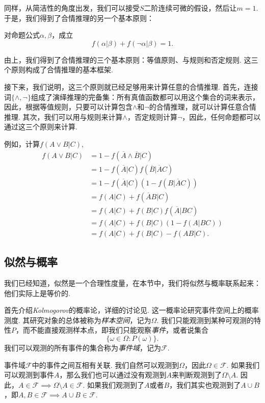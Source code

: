 同样，从简洁性的角度出发，我们可以接受$S$二阶连续可微的假设，然后让$m=1$. 于是，我们得到了合情推理的另一个基本原则：
\begin{principle}[否定规则]
对命题公式$\alpha,\beta$，成立
\[f(\alpha|\beta) + f(\neg\alpha|\beta) = 1.\]
\end{principle}

由上，我们得到了合情推理的三个基本原则：等值原则、与规则和否定规则. 这三个原则构成了合情推理的基本框架.

接下来，我们说明，这三个原则就已经足够用来计算任意的合情推理. 首先，连接词$\{\wedge,\neg\}$组成了演绎推理的完备集：所有真值函数都可以用这个集合的词来表示，因此，根据等值规则，只要可以计算包含$\wedge$和$\neg$的合情推理，就可以计算任意合情推理. 其次，我们可以用与规则来计算$\wedge$，否定规则计算$\neg$，因此，任何命题都可以通过这三个原则来计算.

\begin{example}
    例如，计算$f(A\vee B|C)$,
        \begin{align*}
            f(A \vee B|C) 
            &= 1 - f(\overline{A}\wedge\overline{B}|C)\\
            & = 1 - f(\overline{A}|C)f(\overline{B}|\overline{A}C) \\
            &= 1 - f(\overline{A}|C)(1 - f(B|\overline{A}C))\\
            &= f(A|C) + f(\overline{A}B|C) \\
            &= f(A|C) + f(B|C)f(\overline{A}|BC) \\
            &= f(A|C) + f(B|C)(1 - f(A|BC))\\
            &= f(A|C) + f(B|C) - f(AB|C).
        \end{align*}
\end{example}


\subsection{似然与概率}
我们已经知道，似然是一个合理性度量，在本节中，我们将似然与概率联系起来：他们实际上是等价的.

首先介绍\textit{Kolmogorov}的概率论，详细的讨论见. 这一概率论研究事件空间上的概率测度. 其研究对象的总体被称为\textit{样本空间}，记为$\Omega$. 我们只能观测到某种可观测的特性$P$，而不能直接观测样本点，即我们只能观察\textit{事件}，或者说集合
    \[\{\omega\in \Omega:P(\omega)\}.\]
我们可以观测的所有事件的集合称为\textit{事件域}，记为$\mathscr{F}$.

事件域$\mathscr{F}$中的事件之间互相有关联. 我们自然可以观测到$\Omega$，因此$\Omega\in\mathscr{F}$. 如果我们可以观测到事件$A$，那么我们也可以通过没有观测到$A$来判断观测到了$\Omega\setminus A$. 因此，$A\in\mathscr{F}\implies \Omega\setminus A\in\mathscr{F}$. 如果我们观测到了$A$或者$B$，我们其实也观测到了$A\cup B$，即$A,B\in\mathscr{F}\implies A\cup B\in\mathscr{F}$.


